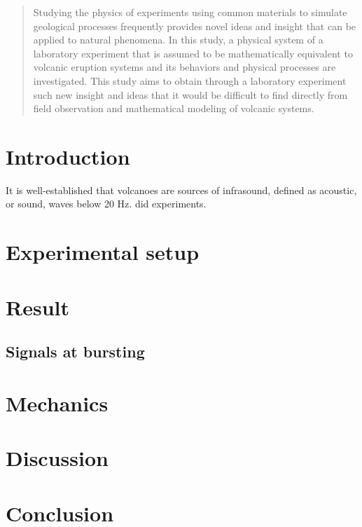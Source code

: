 \documentclass[12pt]{article}
\begin{document}
\linenumbers
\begin{abstract}
Studying the physics of experiments using common materials to simulate geological processes frequently provides novel ideas and insight that can be applied to natural phenomena.
In this study, a physical system of a laboratory experiment that is assumed to be mathematically equivalent to volcanic eruption systems and its behaviors and physical processes are investigated.
This study aims to obtain through a laboratory experiment such new insight and ideas that it would be difficult to find directly from field observation and mathematical modeling of volcanic systems.
\end{abstract} 

\newpage
\cleardoublepage

\renewcommand{\thesection}{\Roman{section}.}
\renewcommand{\thesubsection}{\Alph{subsection}.}

\section{Introduction}\label{intro}
It is well-established that volcanoes are sources of infrasound, defined as acoustic, or sound, waves below 20 Hz.
\cite{kanno2018} did experiments.

\section{Experimental setup}\label{setup}

\section{Result}\label{res}
\subsection{Signals at bursting}

\section{Mechanics}\label{mec}

\section{Discussion}\label{mec}

\section{Conclusion}\label{con}



\clearpage \newpage

 
\end{document}

